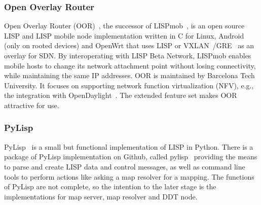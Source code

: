 \subsubsection{Open Overlay Router}
\label{subsubsec:implementation_oor}
Open Overlay Router (OOR)~\cite{OOR}, the successor of LISPmob~\cite{cabellos2011lispmob}, is an open source LISP and LISP mobile node implementation written in C for Linux, Android (only on rooted devices) and OpenWrt that uses LISP or VXLAN~\cite{mahalingam2014virtual}/GRE~\cite{hanks2000generic} as an overlay for SDN. %
By interoperating with LISP Beta Network, LISPmob enables mobile hosts to change its network attachment point without losing connectivity, while maintaining the same IP addresses. OOR is maintained by Barcelona Tech University. It focuses on supporting network function virtualization (NFV), e.g., %
the integration with OpenDaylight~\cite{OpenDaylight}. The extended feature set makes OOR attractive for use.



\subsubsection{PyLisp}
\label{subsubsec:implementation_pylisp}
PyLisp~\cite{pylisp} is a small but functional implementation of LISP in Python. There is a package of PyLisp implementation on Github, called pylisp~\cite{pylispgithub} providing the means to parse and create LISP data and control messages, as well as command line tools to perform actions like asking a map resolver for a mapping. The functions of PyLisp are not complete, so the intention to the later stage is the implementations for map server, map resolver and DDT node.


